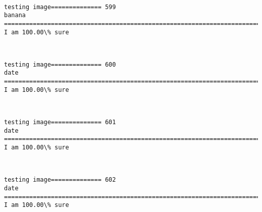 \documentclass[11pt]{article}
\begin{document}
    \begin{center}
    \end{center}
    { \hspace*{\fill} \\}
    
    \begin{Verbatim}[commandchars=\\\{\}]
testing image============== 599
banana
============================================================================
I am 100.00\% sure

    \end{Verbatim}

    \begin{center}
    \end{center}
    { \hspace*{\fill} \\}
    
    \begin{Verbatim}[commandchars=\\\{\}]
testing image============== 600
date
============================================================================
I am 100.00\% sure

    \end{Verbatim}

    \begin{center}
    \end{center}
    { \hspace*{\fill} \\}
    
    \begin{Verbatim}[commandchars=\\\{\}]
testing image============== 601
date
============================================================================
I am 100.00\% sure

    \end{Verbatim}

    \begin{center}
    \end{center}
    { \hspace*{\fill} \\}
    
    \begin{Verbatim}[commandchars=\\\{\}]
testing image============== 602
date
============================================================================
I am 100.00\% sure

    \end{Verbatim}
\end{document}
